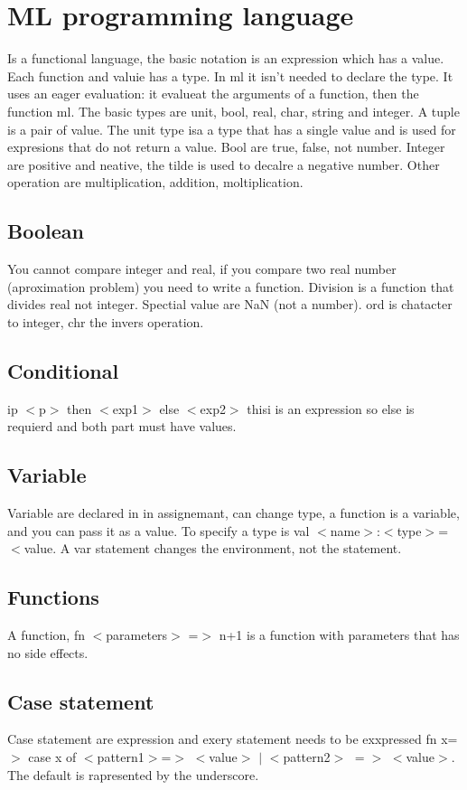 \chapter{ML programming language}
Is a functional language, the basic notation is an expression which has a value. Each function and valuie has a type. In ml it isn't needed to declare the type. It uses an eager
evaluation: it evalueat the arguments of a function, then the function ml. The basic types are unit, bool, real, char, string and integer. A tuple is a pair of value. The unit
type isa a type that has a single value and is used for expresions that do not return a value. Bool are true, false, not number. Integer are positive and neative, the tilde 
is used to decalre a negative number. Other operation are multiplication, addition, moltiplication. 
\section{Boolean}
You cannot compare integer and real, if you compare two real number (aproximation problem) you need to write a function. Division is a function that divides real not integer.
Spectial value are NaN (not a number). ord is chatacter to integer, chr the invers operation.
\section{Conditional}
ip $<$p$>$ then $<$exp1$>$ else $<$exp2$>$ thisi is an expression so else is requierd and both part must have values.
\section{Variable}
Variable are declared in in assignemant, can change type, a function is a variable, and you can pass it as a value. To specify a type is val $<$name$>$:$<$type$>$=$<$value. A var statement changes the environment, not the statement.
\section{Functions}
A function, fn $<$parameters$>$ =$>$ n+1 is a function with parameters that has no side effects.
\section{Case statement}
Case statement are expression and exery statement needs to be exxpressed fn x=$>$ case x of $<$pattern1$>$=$>$ $<$value$>$ $|$ $<$pattern2$>$ $=>$ $<$value$>$. The default is
rapresented by the underscore.
